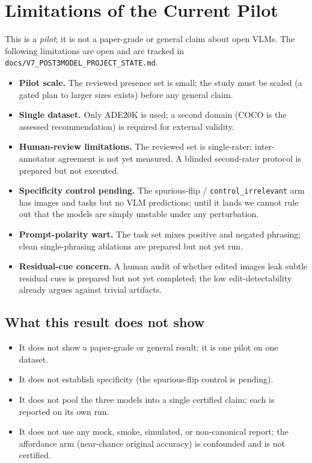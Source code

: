 \section{Limitations of the Current Pilot}

This is a \emph{pilot}; it is not a paper-grade or general claim about open VLMs. The
following limitations are open and are tracked in
\texttt{docs/V7\_POST3MODEL\_PROJECT\_STATE.md}.

\begin{itemize}
  \item \textbf{Pilot scale.} The reviewed presence set is small; the study must be scaled
        (a gated plan to larger sizes exists) before any general claim.
  \item \textbf{Single dataset.} Only ADE20K is used; a second domain (COCO is the assessed
        recommendation) is required for external validity.
  \item \textbf{Human-review limitations.} The reviewed set is single-rater; inter-annotator
        agreement is not yet measured. A blinded second-rater protocol is prepared but not
        executed.
  \item \textbf{Specificity control pending.} The spurious-flip / \texttt{control\_irrelevant}
        arm has images and tasks but no VLM predictions; until it lands we cannot rule out
        that the models are simply unstable under any perturbation.
  \item \textbf{Prompt-polarity wart.} The task set mixes positive and negated phrasing;
        clean single-phrasing ablations are prepared but not yet run.
  \item \textbf{Residual-cue concern.} A human audit of whether edited images leak subtle
        residual cues is prepared but not yet completed; the low edit-detectability already
        argues against trivial artifacts.
\end{itemize}

\subsection{What this result does not show}
\begin{itemize}
  \item It does not show a paper-grade or general result; it is one pilot on one dataset.
  \item It does not establish specificity (the spurious-flip control is pending).
  \item It does not pool the three models into a single certified claim; each is reported on
        its own run.
  \item It does not use any mock, smoke, simulated, or non-canonical report; the affordance
        arm (near-chance original accuracy) is confounded and is not certified.
\end{itemize}
